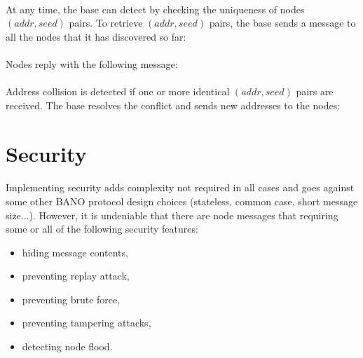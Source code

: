\documentclass[a4paper, 11pt]{article}
\begin{document}
\paragraph{} At any time, the base can detect by checking the uniqueness of
nodes $(addr,seed)$ pairs. To retrieve $(addr,seed)$ pairs, the base sends a
message to all the nodes that it has discovered so far:

\paragraph{}
Nodes reply with the following message:

\paragraph{}
Address collision is detected if one or more identical $(addr,seed)$
pairs are received. The base resolves the conflict and sends new addresses
to the nodes:


\clearpage
\section{Security}

\paragraph{}
Implementing security adds complexity not required in all cases and goes
against some other BANO protocol design choices (stateless, common case,
short message size...). However, it is undeniable that there are node
messages that requiring some or all of the following security features:
\begin{itemize}
\item hiding message contents,
\item preventing replay attack,
\item preventing brute force,
\item preventing tampering attacks,
\item detecting node flood.
\end{itemize}
\end{document}
